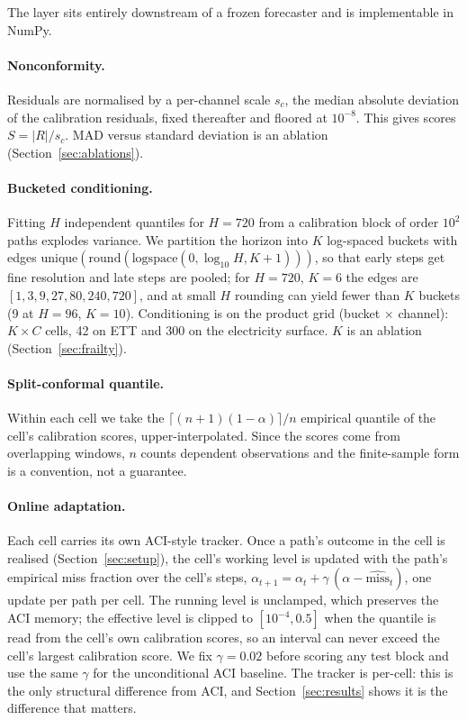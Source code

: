\documentclass[11pt]{article}
\begin{document}
The layer sits entirely downstream of a frozen forecaster and is implementable in NumPy.

\paragraph{Nonconformity.} Residuals are normalised by a per-channel scale $s_c$, the median absolute deviation of the calibration residuals, fixed thereafter and floored at $10^{-8}$. This gives scores $S = |R|/s_c$. MAD versus standard deviation is an ablation (Section~\ref{sec:ablations}).

\paragraph{Bucketed conditioning.} Fitting $H$ independent quantiles for $H = 720$ from a calibration block of order $10^2$ paths explodes variance. We partition the horizon into $K$ log-spaced buckets with edges $\mathrm{unique}(\mathrm{round}(\mathrm{logspace}(0, \log_{10} H, K{+}1)))$, so that early steps get fine resolution and late steps are pooled; for $H = 720$, $K = 6$ the edges are $[1,3,9,27,80,240,720]$, and at small $H$ rounding can yield fewer than $K$ buckets (9 at $H = 96$, $K = 10$). Conditioning is on the product grid (bucket $\times$ channel): $K \times C$ cells, 42 on ETT and 300 on the electricity surface. $K$ is an ablation (Section~\ref{sec:frailty}).

\paragraph{Split-conformal quantile.} Within each cell we take the $\lceil (n{+}1)(1{-}\alpha) \rceil / n$ empirical quantile of the cell's calibration scores, upper-interpolated. Since the scores come from overlapping windows, $n$ counts dependent observations and the finite-sample form is a convention, not a guarantee.

\paragraph{Online adaptation.} Each cell carries its own ACI-style tracker. Once a path's outcome in the cell is realised (Section~\ref{sec:setup}), the cell's working level is updated with the path's empirical miss fraction over the cell's steps, $\alpha_{t+1} = \alpha_t + \gamma\,(\alpha - \widehat{\mathrm{miss}}_t)$, one update per path per cell. The running level is unclamped, which preserves the ACI memory; the effective level is clipped to $[10^{-4}, 0.5]$ when the quantile is read from the cell's own calibration scores, so an interval can never exceed the cell's largest calibration score. We fix $\gamma = 0.02$ before scoring any test block and use the same $\gamma$ for the unconditional ACI baseline. The tracker is per-cell: this is the only structural difference from ACI, and Section~\ref{sec:results} shows it is the difference that matters.
\end{document}
